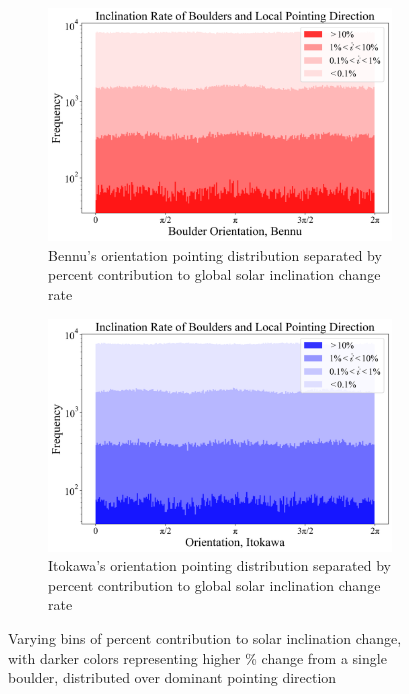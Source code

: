 \begin{figure}[H]
    \begin{subfigure}{0.49\textwidth}
        \centering
        \includegraphics[width=\textwidth]{fig/boulder_west_stacked_bennu.png}
        \caption{Bennu's orientation pointing distribution separated by percent contribution to global solar inclination change rate}
    \end{subfigure}
    \hfill
    \begin{subfigure}{0.49\textwidth}
        \centering
        \includegraphics[width=\textwidth]{fig/boulder_west_stacked_itokawa.png}
        \caption{Itokawa's orientation pointing distribution separated by percent contribution to global solar inclination change rate}
    \end{subfigure}  
    \caption{Varying bins of percent contribution to solar inclination change, with darker colors representing higher \% change from a single boulder, distributed over dominant pointing direction}
    \label{fig:west_onepercent}
\end{figure}

